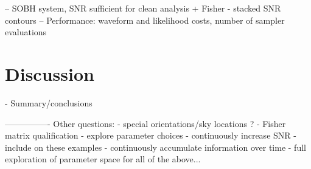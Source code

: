 \documentclass[aps,showpacs,twocolumn,prd,superscriptaddress,nofootinbib]{revtex4}
\begin{document}
-- SOBH system, SNR sufficient for clean analysis + Fisher - stacked SNR contours
-- Performance: waveform and likelihood costs, number of sampler evaluations


\section{Discussion}
\label{sec:discussion}

- Summary/conclusions


----------------
Other questions:
- special orientations/sky locations ?
- Fisher matrix qualification - explore parameter choices
- continuously increase SNR - include on these examples
- continuously accumulate information over time
- full exploration of parameter space for all of the above...


\end{document}
